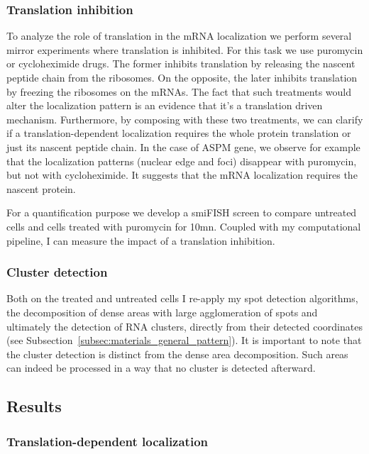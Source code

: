 \subsubsection{Translation inhibition}

To analyze the role of translation in the \ac{mRNA} localization we perform several mirror experiments where translation is inhibited.
For this task we use puromycin or cycloheximide drugs.
The former inhibits translation by releasing the nascent peptide chain from the ribosomes.
On the opposite, the later inhibits translation by freezing the ribosomes on the \ac{mRNA}s.
The fact that such treatments would alter the localization pattern is an evidence that it's a translation driven mechanism.
Furthermore, by composing with these two treatments, we can clarify if a translation-dependent localization requires the whole protein translation or just its nascent peptide chain.
In the case of ASPM gene, we observe for example that the localization patterns (nuclear edge and foci) disappear with puromycin, but not with cycloheximide.
It suggests that the \ac{mRNA} localization requires the nascent protein.

For a quantification purpose we develop a \ac{smiFISH} screen to compare untreated cells and cells treated with puromycin for 10mn.
Coupled with my computational pipeline, I can measure the impact of a translation inhibition.

\subsubsection{Cluster detection}

Both on the treated and untreated cells I re-apply my spot detection algorithms, the decomposition of dense areas with large agglomeration of spots and ultimately the detection of \ac{RNA} clusters, directly from their detected coordinates (see Subsection~\ref{subsec:materials_general_pattern}).
It is important to note that the cluster detection is distinct from the dense area decomposition.
Such areas can indeed be processed in a way that no cluster is detected afterward.

\subsection{Results}
\label{subsec:results_translation_factories}

\subsubsection{Translation-dependent localization}


